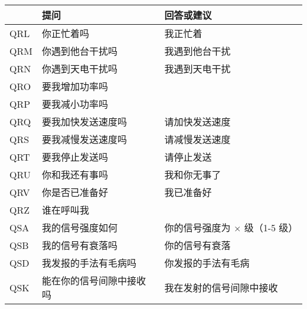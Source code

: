 \begin{longtable}{|l|l|l|}
  \hline
                         & \textbf{提问}                       & \textbf{回答或建议}                    \\
  \hline
  QRL                    & 你正忙着吗                             & 我正忙着                              \\
  \hline
  QRM                    & 你遇到他台干扰吗                          & 我遇到他台干扰                           \\
  \hline
  QRN                    & 你遇到天电干扰吗                          & 我遇到天电干扰                           \\
  \hline
  QRO                    & 要我增加功率吗                           &                                   \\
  \hline
  QRP                    & 要我减小功率吗                           &                                   \\
  \hline
  QRQ                    & 要我加快发送速度吗                         & 请加快发送速度                           \\
  \hline
  QRS                    & 要我减慢发送速度吗                         & 请减慢发送速度                           \\
  \hline
  QRT                    & 要我停止发送吗                           & 请停止发送                             \\
  \hline
  QRU                    & 你和我还有事吗                           & 我和你无事了                            \\
  \hline
  QRV                    & 你是否已准备好                           & 我已准备好                             \\
  \hline
  QRZ                    & 谁在呼叫我                             &                                   \\
  \hline
  QSA                    & 我的信号强度如何                          & 你的信号强度为 × 级（1-5 级）                \\
  \hline
  QSB                    & 我的信号有衰落吗                          & 你的信号有衰落                           \\
  \hline
  QSD                    & 我发报的手法有毛病吗                        & 你发报的手法有毛病                         \\
  \hline
  \multirow{2}{1em}{QSK} & 能在你的信号间隙中接收吗                      & 我在发射的信号间隙中接收                      \\

\end{longtable}
